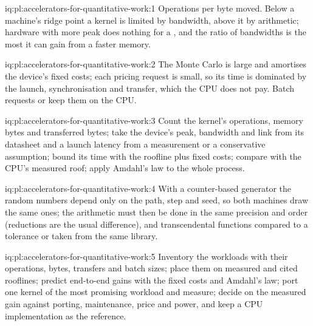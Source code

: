 \begin{solution}{iq:pl:accelerators-for-quantitative-work:1}
Operations per byte moved. Below a machine's ridge point a kernel is limited by bandwidth, above it by arithmetic; hardware with more peak
does nothing for a , and the ratio of bandwidths is the most it can gain from a faster memory.
\end{solution}

\begin{solution}{iq:pl:accelerators-for-quantitative-work:2}
The Monte Carlo is large and amortises the device's fixed costs; each pricing request is small, so its time is dominated by the launch,
synchronisation and transfer, which the CPU does not pay. Batch requests or keep them on the CPU.
\end{solution}

\begin{solution}{iq:pl:accelerators-for-quantitative-work:3}
Count the kernel's operations, memory bytes and transferred bytes; take the device's peak, bandwidth and link from its datasheet and a
launch latency from a measurement or a conservative assumption; bound its time with the roofline plus fixed costs; compare with the CPU's
measured roof; apply Amdahl's law to the whole process.
\end{solution}

\begin{solution}{iq:pl:accelerators-for-quantitative-work:4}
With a counter-based generator the random numbers depend only on the path, step and seed, so both machines draw the same ones; the
arithmetic must then be done in the same precision and order (reductions are the usual difference), and transcendental functions compared to a
tolerance or taken from the same library.
\end{solution}

\begin{solution}{iq:pl:accelerators-for-quantitative-work:5}
Inventory the workloads with their operations, bytes, transfers and batch sizes; place them on measured and cited rooflines; predict end-to-end
gains with the fixed costs and Amdahl's law; port one kernel of the most promising workload and measure; decide on the measured gain against
porting, maintenance, price and power, and keep a CPU implementation as the reference.
\end{solution}
